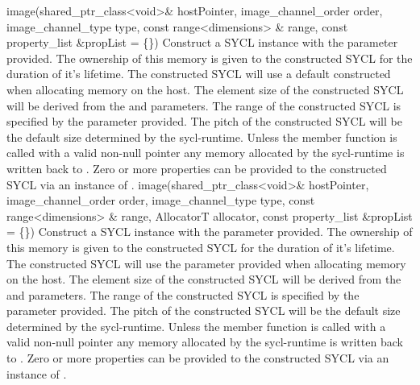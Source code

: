     \addRowFiveSL
    {image(shared_ptr_class<void>\& hostPointer, }
    { image_channel_order order, }
    { image_channel_type type, }
    { const range<dimensions> \& range, }
    { const property_list \&propList = \{\}) }
    {
         Construct a SYCL  instance with the  parameter provided. The ownership of this memory is given to the constructed SYCL  for the duration of it's lifetime.
         The constructed SYCL  will use a default constructed  when allocating memory on the host.
         The element size of the constructed SYCL  will be derived from the  and  parameters.
         The range of the constructed SYCL  is specified by the  parameter provided.
         The pitch of the constructed SYCL  will be the default size determined by the \gls{sycl-runtime}.
         Unless the member function  is called with a valid non-null pointer any memory allocated by the \gls{sycl-runtime} is written back to .
         Zero or more properties can be provided to the constructed SYCL  via an instance of .
    }
    \addRowSixSL
    {image(shared_ptr_class<void>\& hostPointer, }
    { image_channel_order order, }
    { image_channel_type type, }
    { const range<dimensions> \& range, }
    { AllocatorT allocator, }
    { const property_list \&propList = \{\}) }
    {
         Construct a SYCL  instance with the  parameter provided. The ownership of this memory is given to the constructed SYCL  for the duration of it's lifetime.
         The constructed SYCL  will use the  parameter provided when allocating memory on the host.
         The element size of the constructed SYCL  will be derived from the  and  parameters.
         The range of the constructed SYCL  is specified by the  parameter provided.
         The pitch of the constructed SYCL  will be the default size determined by the \gls{sycl-runtime}.
         Unless the member function  is called with a valid non-null pointer any memory allocated by the \gls{sycl-runtime} is written back to .
         Zero or more properties can be provided to the constructed SYCL  via an instance of .
    }    
